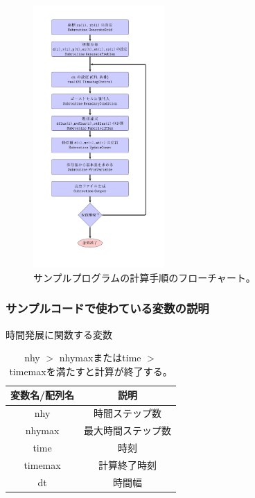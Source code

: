 {\begin{enumerate}
\begin{itemize}
     \end{itemize}
\end{enumerate}


\begin{figure}[h]
    \centering
    \includegraphics[width=5cm]{flowchart_HD1.pdf}
    \caption{サンプルプログラムの計算手順のフローチャート。
    }
    \label{fig:fc_HD1}
\end{figure}


\subsubsection{サンプルコードで使わている変数の説明}

\begin{table}[h]
\begin{center}
\caption{時間発展に関数する変数}
\begin{tabular}{|c|c|}
    \hline
    変数名/配列名 & 説明 \\
    \hline
    \hline
    {\ttfamily nhy} & 時間ステップ数 \\
    \hline
    {\ttfamily nhymax} & 最大時間ステップ数 \\
    \hline
    {\ttfamily time } & 時刻 \\
    \hline
    {\ttfamily timemax } & 計算終了時刻 \\
    \hline
    {\ttfamily dt} & 時間幅 \\
    \hline
\end{tabular}
\end{center}
\caption{ {\ttfamily nhy $>$ nhymax}または{\ttfamily time $>$ timemax}を満たすと計算が終了する。}
\end{table}

}
